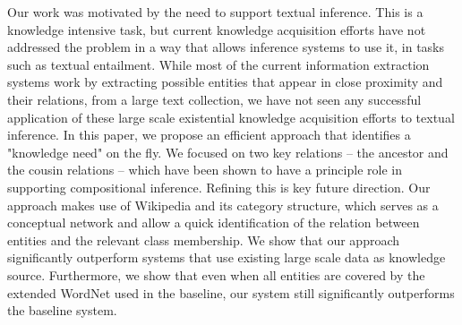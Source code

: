 
Our work was motivated by the need to support textual inference. This is a knowledge intensive task, but current knowledge acquisition efforts have not addressed the problem in a way that allows inference systems to use it, in tasks such as textual entailment.
While most of the current information extraction systems work by extracting possible entities that appear in close proximity and their relations, from a large text collection, we have not seen any successful application of these large scale existential knowledge acquisition efforts to textual inference. In this paper, we propose an efficient approach that identifies a "knowledge need" on the fly. We focused on two key relations -- the ancestor and the cousin relations -- which have been shown to have a principle role in supporting compositional inference. Refining this is key future direction.  
Our approach makes use of Wikipedia and its category structure, which serves as a conceptual network and allow a quick identification of the relation between entities and the relevant class membership. We show that our approach significantly outperform systems that use existing large scale data as knowledge source.
Furthermore, we show that even when all entities are covered by the extended WordNet used in the baseline, our system still significantly outperforms the baseline system.   